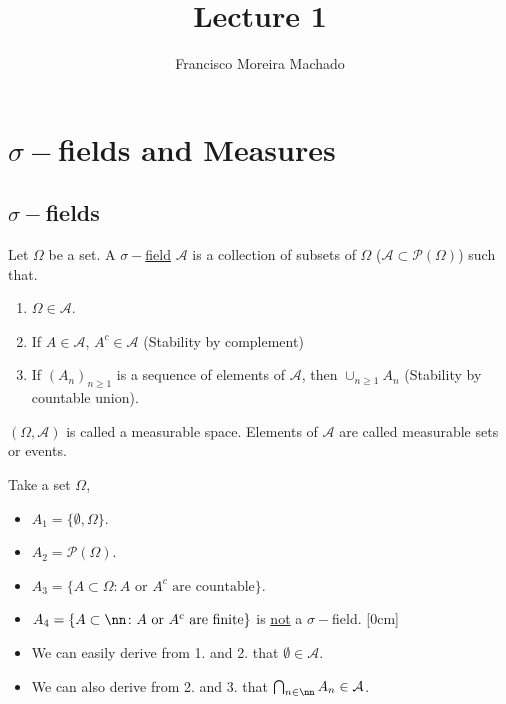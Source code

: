 \documentclass{scrartcl}
\author{Francisco Moreira Machado}
\title{Lecture 1}
\begin{document}
  \section{$\sigma-$fields and Measures}
  \subsection{$\sigma-$fields}
  \begin{definition*}
    Let $ \Omega $ be a set. A \underline{$\sigma-$field} $\mathcal{A}$ is a collection of
    subsets of $\Omega$ ($\mathcal{A}\subset\mathcal{P}(\Omega)$) such that.
    \begin{enumerate}
    \item $\Omega \in \mathcal{A}$.
    \item If $A \in \mathcal{A}$, $A^c \in \mathcal{A}$ (Stability by complement)
    \item If $(A_n)_{n \geq 1}$ is a sequence of elements of $\mathcal{A}$, then $\cup_{n \geq
      1} A_n $ (Stability by countable union).
    \end{enumerate}
  \end{definition*}

  $(\Omega, \mathcal{A})$ is called a measurable space. Elements of $\mathcal{A}$ are called
  measurable sets or events.

  \begin{example}
      Take a set $\Omega$,
      \begin{itemize}
        \item $A_1 = \{ \emptyset, \Omega \} $.
        \item $A_2 = \mathcal{P}(\Omega) $.
        \item $A_3 = \{ A \subset \Omega \colon A \text{ or } A^c \text{ are countable} \} $.
        \item $A_4 = \{ A \subset \nn \colon  A \text{ or } A^c \text{ are finite} \} $ is
          \underline{not} a $\sigma-$field.
        [0cm]
      \end{itemize}
  \end{example}

  \begin{remark}
    \hfill
    \begin{itemize}
      \item We can easily derive from 1. and 2. that $\emptyset \in \mathcal{A}$.
      \item We can also derive from 2. and 3. that $\bigcap_{n \in \nn} A_n \in \mathcal{A}$.
    \end{itemize}
  \end{remark}
\end{document}
